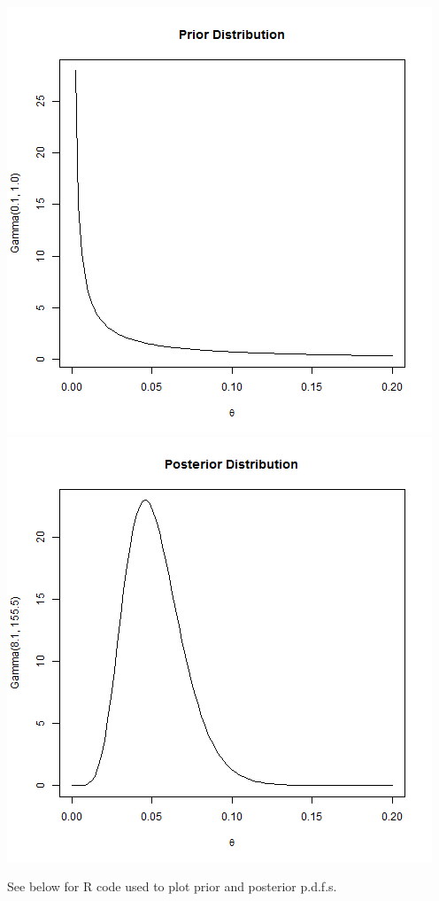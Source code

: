 \documentclass{article}
\begin{document}
\begin{enumerate}
\includegraphics[scale=0.45]{prior}
\includegraphics[scale=0.45]{post}

\pagebreak

See below for R code used to plot prior and posterior p.d.f.s.



\end{enumerate}
\end{document}
